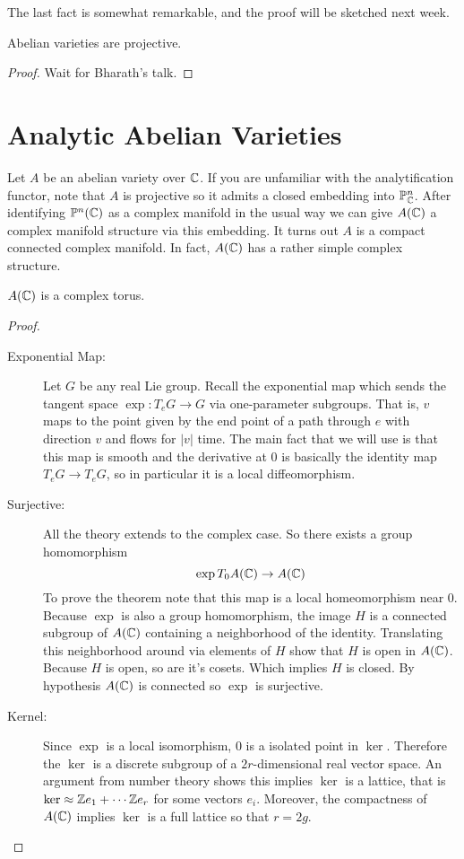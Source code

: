 \documentclass[11pt]{article}
\begin{document}
The last fact is somewhat remarkable, and the proof will be sketched next week.

\begin{prop}
	Abelian varieties are projective.
\end{prop}
\begin{proof}
	Wait for Bharath's talk.
\end{proof}

\section{Analytic Abelian Varieties}

Let $A$ be an abelian variety over $\mathbb{C}$. If you are unfamiliar with the analytification functor, note that $A$ is projective so it admits a closed embedding into $\mathbb{P}^n_{\mathbb{C}}$. After identifying $\mathbb{P}^n(\mathbb{C})$ as a complex manifold in the usual way we can give $A(\mathbb{C})$ a complex manifold structure via this embedding. It turns out $A$ is a compact connected complex manifold. In fact, $A(\mathbb{C})$ has a rather simple complex structure.

\begin{thm}\label{av_cmplx_tori}
	$A(\mathbb{C})$ is a complex torus.
\end{thm}
\begin{proof}
\hfill
\begin{description}
	\item[Exponential Map:]
		Let $G$ be any real Lie group. Recall the exponential map which sends the tangent space $\exp: T_eG \to G$ via one-parameter subgroups. That is, $v$ maps to the point given by the end point of a path through $e$ with direction $v$ and flows for $|v|$ time. The main fact that we will use is that this map is smooth and the derivative at $0$ is basically the identity map $T_eG \to T_eG$, so in particular it is a local diffeomorphism.
	\item[Surjective:]
		All the theory extends to the complex case. So there exists a group homomorphism
		$$
		\exp T_0A(\mathbb{C}) \to A(\mathbb{C})
		$$
		To prove the theorem note that this map is a local homeomorphism near $0$. Because $\exp$ is also a group homomorphism, the image $H$ is a connected subgroup of $A(\mathbb{C})$ containing a neighborhood of the identity. Translating this neighborhood around via elements of $H$ show that $H$ is open in $A(\mathbb{C})$. Because $H$ is open, so are it's cosets. Which implies $H$ is closed. By hypothesis $A(\mathbb{C})$ is connected so $\exp$ is surjective.
	\item[Kernel:]
		Since $\exp$ is a local isomorphism, $0$ is a isolated point in $\ker$. Therefore the $\ker$ is a discrete subgroup of a $2r$-dimensional real vector space. An argument from number theory shows this implies $\ker$ is a lattice, that is $\ker \approx \mathbb{Z} e_1 + \cdots \mathbb{Z} e_r$ for some vectors $e_i$. Moreover, the compactness of $A(\mathbb{C})$ implies $\ker$ is a full lattice so that $r = 2g$.
\end{description}
\end{proof}
\end{document}
